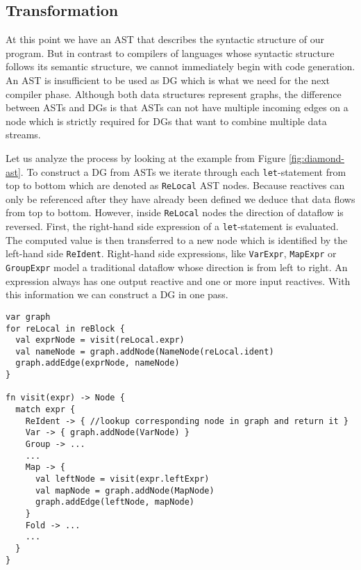 \subsection{Transformation}
\label{rerust:impl:compiler:transform}
At this point we have an \ac{AST} that describes the syntactic structure of our \rerust program. But in contrast to compilers of languages whose syntactic structure follows its semantic structure, we cannot immediately begin with code generation. An \ac{AST} is insufficient to be used as \ac{DG} which is what we need for the next compiler phase. Although both data structures represent graphs, the difference between \ac{AST}s and \ac{DG}s is that \ac{AST}s can not have multiple incoming edges on a node which is strictly required for \ac{DG}s that want to combine multiple data streams.

Let us analyze the process by looking at the example from Figure \ref{fig:diamond-ast}. To construct a \ac{DG} from \rerust \ac{AST}s we iterate through each \lstinline{let}-statement from top to bottom which are denoted as \lstinline{ReLocal} \ac{AST} nodes. Because reactives can only be referenced after they have already been defined we deduce that data flows from top to bottom. However, inside \lstinline{ReLocal} nodes the direction of dataflow is reversed. First, the right-hand side expression of a \lstinline{let}-statement is evaluated. The computed value is then transferred to a new node which is identified by the left-hand side \lstinline{ReIdent}. Right-hand side expressions, like \lstinline{VarExpr}, \lstinline{MapExpr} or \lstinline{GroupExpr} model a traditional dataflow whose direction is from left to right. An expression always has one output reactive and one or more input reactives. With this information we can construct a \ac{DG} in one pass.

\begin{lstlisting}[caption=Pseudo code for DG generation,label=lst:dg-pseudo]
var graph
for reLocal in reBlock {
  val exprNode = visit(reLocal.expr)
  val nameNode = graph.addNode(NameNode(reLocal.ident)
  graph.addEdge(exprNode, nameNode)
}

fn visit(expr) -> Node {
  match expr {
    ReIdent -> { //lookup corresponding node in graph and return it }
    Var -> { graph.addNode(VarNode) }
    Group -> ...
    ...
    Map -> { 
      val leftNode = visit(expr.leftExpr)
      val mapNode = graph.addNode(MapNode) 
      graph.addEdge(leftNode, mapNode)
    }
    Fold -> ...
    ...
  }
}
  
\end{lstlisting}

